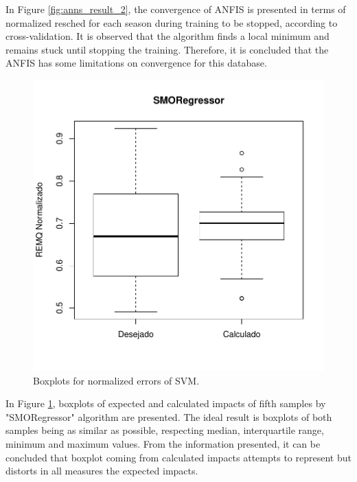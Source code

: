 In Figure \ref{fig:anns_result_2}, the convergence of ANFIS is presented in terms of normalized resched for each season during training to be stopped, according to cross-validation. It is observed that the algorithm finds a local minimum and remains stuck until stopping the training. Therefore, it is concluded that the ANFIS has some limitations on convergence for this database.

\begin{figure}[!h]
  \vspace{-0.2cm}
  \centering
  \includegraphics[trim = 1mm 12mm 1mm 1mm,clip,width=0.7\columnwidth]{image/smoreg_ex4.pdf}
  \caption{Boxplots for normalized errors of SVM.}
  \label{fig:anns_result_5}
\end{figure}

In Figure \ref{fig:anns_result_5}, boxplots of expected and calculated impacts of fifth samples by "SMORegressor" algorithm are presented. The ideal result is boxplots of both samples being as similar as possible, respecting median, interquartile range, minimum and maximum values. From the information presented, it can be concluded that boxplot coming from calculated impacts attempts to represent but distorts in all measures the expected impacts.

